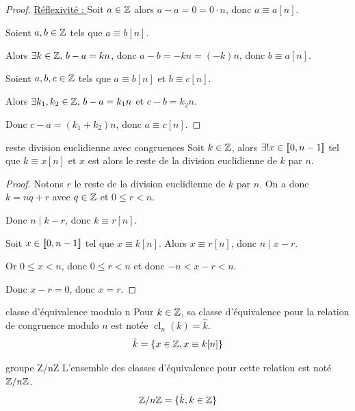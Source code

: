 \begin{proof}
    \uline{Réflexivité : }
    Soit $a \in \mathbb{Z}$ alors $a - a = 0 = 0 \cdot n$, donc $a \equiv a [n]$.

    Soient $a, b \in \mathbb{Z}$ tels que $a \equiv b [n]$.

    \svspace Alors $\exists k \in \mathbb{Z}, \, b - a = kn$, donc $a - b = -kn = (-k)n$, donc $b \equiv a [n]$.

     Soient $a, b, c \in \mathbb{Z}$ tels que $a \equiv b [n]$ et $b \equiv c [n]$.

    \svspace Alors $\exists k_1, k_2 \in \mathbb{Z}, \, b - a = k_1 n$ et $c - b = k_2 n$.

    Donc $c - a = (k_1 + k_2)n$, donc $a \equiv c [n]$.

\end{proof}

\begin{proposition}{reste division euclidienne avec congruences}{}
    Soit $k \in \mathbb{Z}$, alors $\exists ! x \in [\![0, n-1]\!]$ tel que $k \equiv x [n]$ 
    et $x$ est alors le reste de la division euclidienne de $k$ par $n$.
\end{proposition}


\begin{proof}
    Notons $r$ le reste de la division euclidienne de $k$ par $n$. 
    On a donc $k = nq + r$ avec $q \in \mathbb{Z}$ et $0 \leqslant r < n$.
    
    Donc $n \mid k - r$, donc $k \equiv r [n]$.

    \avspace Soit $x \in [\![0, n-1]\!]$ tel que $x \equiv k [n]$.
    Alors $x \equiv r [n]$, donc $n \mid x - r$.

    Or $0 \leqslant x < n$, donc $0 \leqslant r < n$
    et donc $-n < x - r < n$.

    Donc $x - r = 0$, donc $x = r$.
\end{proof}

\begin{definition}{classe d'équivalence modulo n}{}
    Pour $k \in \mathbb{Z}$, sa classe d'équivalence pour la relation de congruence modulo $n$ 
    est notée $\operatorname{cl}_n(k) = \hat k$. 
    $$\hat k = \{x \in \mathbb{Z}, x \equiv k [n]\}$$
\end{definition}

\begin{definition}{groupe Z/nZ}{}
    L'ensemble des classes d'équivalence pour cette relation est noté $\mathbb{Z}/n\mathbb{Z}$.
    $$\mathbb{Z}/n\mathbb{Z} = \{\hat k, k \in \mathbb{Z}\}$$
\end{definition}

